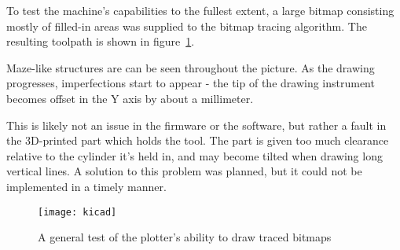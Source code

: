 To test the machine's capabilities to the fullest extent, a large bitmap
consisting mostly of filled-in areas was supplied to the bitmap tracing
algorithm. The resulting toolpath is shown in figure~\ref{kicad}.

Maze-like structures are can be seen throughout the picture. As the drawing
progresses, imperfections start to appear - the tip of the drawing instrument
becomes offset in the Y axis by about a millimeter.

This is likely not an issue in the firmware or the software, but rather a fault
in the 3D-printed part which holds the tool. The part is given too much
clearance relative to the cylinder it's held in, and may become tilted when
drawing long vertical lines. A solution to this problem was planned, but it
could not be implemented in a timely manner.

\begin{figure}[ht]
    \begin{center}
        \texttt{[image: kicad]}
        \caption{A general test of the plotter's ability to draw traced
        bitmaps}
        \label{kicad}
    \end{center}
\end{figure}
